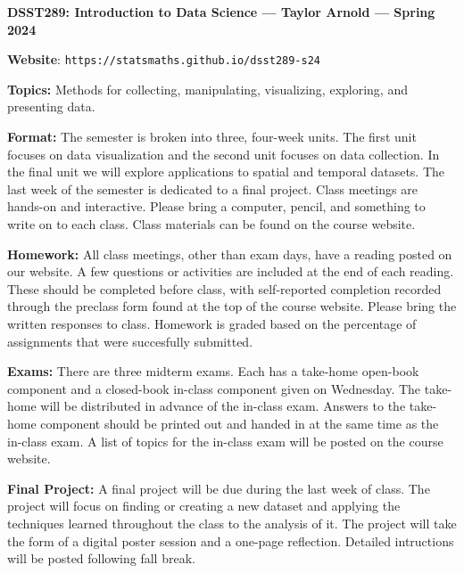\documentclass[11pt, a4paper]{article}
\begin{document}
\begin{center}
\textbf{DSST289: Introduction to Data Science --- Taylor Arnold --- Spring 2024}
\end{center}

\vspace{0.5cm}

\textbf{Website}: \texttt{https://statsmaths.github.io/dsst289-s24}

\bigskip

\textbf{Topics:}
Methods for collecting, manipulating, visualizing, exploring, and presenting
data.

\bigskip

\textbf{Format:}
The semester is broken into three, four-week units. The first unit focuses on
data visualization and the second unit focuses on data collection. In the final
unit we will explore applications to spatial and temporal datasets. The
last week of the semester is dedicated to a final project. Class meetings are
hands-on and interactive. Please bring a computer, pencil, and something to
write on to each class. Class materials can be found on the course website.

\bigskip

\textbf{Homework:}
All class meetings, other than exam days, have a reading posted on our website.
A few questions or activities are included at the end of each reading. These
should be completed before class, with self-reported completion recorded
through the preclass form found at the top of the course website. Please bring
the written responses to class. Homework is graded based on the percentage of
assignments that were succesfully submitted.

\bigskip

\textbf{Exams:}
There are three midterm exams. Each has a take-home open-book component and 
a closed-book in-class component given on Wednesday. The take-home will be
distributed in advance of the in-class exam. Answers to the
take-home component should be printed out and handed in at the same time as
the in-class exam. A list of topics for the in-class exam will be posted on
the course website.

\bigskip

\textbf{Final Project:}
A final project will be due during the last week of class. The project will
focus on finding or creating a new dataset and applying the techniques learned
throughout the class to the analysis of it. The project will take the form of
a digital poster session and a one-page reflection. Detailed intructions will
be posted following fall break.
\end{document}
